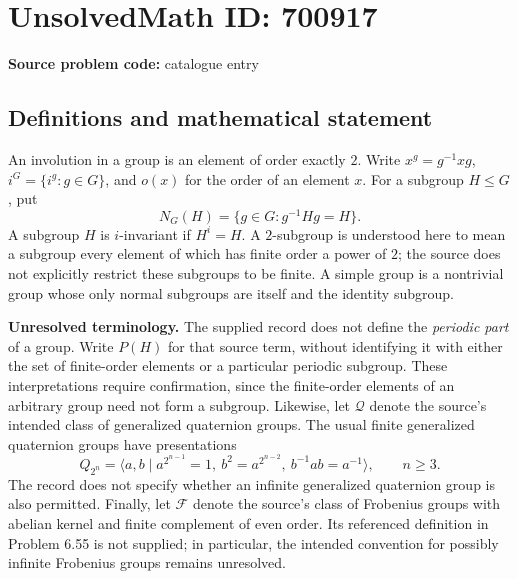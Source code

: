 \documentclass[11pt]{article}
\begin{document}
\section*{UnsolvedMath ID: 700917}
\textbf{Source problem code:} catalogue entry
\subsection{Definitions and mathematical statement}
An involution in a group is an element of order exactly \(2\). Write \(x^g=g^{-1}xg\), \(i^G=\{i^g:g\in G\}\), and \(o(x)\) for the order of an element \(x\). For a subgroup \(H\leq G\), put
\[
N_G(H)=\{g\in G:g^{-1}Hg=H\}.
\]
A subgroup \(H\) is \(i\)-invariant if \(H^i=H\). A \(2\)-subgroup is understood here to mean a subgroup every element of which has finite order a power of \(2\); the source does not explicitly restrict these subgroups to be finite. A simple group is a nontrivial group whose only normal subgroups are itself and the identity subgroup.

\textbf{Unresolved terminology.} The supplied record does not define the \emph{periodic part} of a group. Write \(P(H)\) for that source term, without identifying it with either the set of finite-order elements or a particular periodic subgroup. These interpretations require confirmation, since the finite-order elements of an arbitrary group need not form a subgroup. Likewise, let \(\mathcal Q\) denote the source's intended class of generalized quaternion groups. The usual finite generalized quaternion groups have presentations
\[
Q_{2^n}=\langle a,b\mid a^{2^{n-1}}=1,\ b^2=a^{2^{n-2}},\ b^{-1}ab=a^{-1}\rangle,
\qquad n\geq3.
\]
The record does not specify whether an infinite generalized quaternion group is also permitted. Finally, let \(\mathcal F\) denote the source's class of Frobenius groups with abelian kernel and finite complement of even order. Its referenced definition in Problem 6.55 is not supplied; in particular, the intended convention for possibly infinite Frobenius groups remains unresolved.
\end{document}
